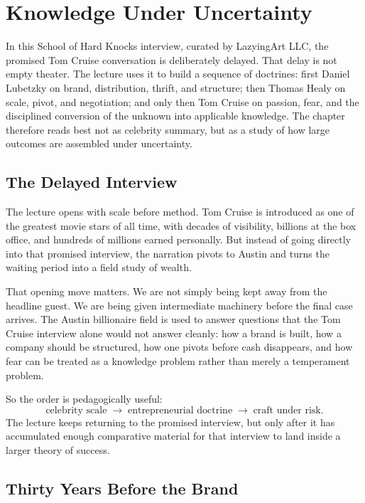 \chapter{Knowledge Under Uncertainty}

In this School of Hard Knocks interview, curated by LazyingArt LLC, the promised Tom Cruise conversation is deliberately delayed. That delay is not empty theater. The lecture uses it to build a sequence of doctrines: first Daniel Lubetzky on brand, distribution, thrift, and structure; then Thomas Healy on scale, pivot, and negotiation; and only then Tom Cruise on passion, fear, and the disciplined conversion of the unknown into applicable knowledge. The chapter therefore reads best not as celebrity summary, but as a study of how large outcomes are assembled under uncertainty.

\section{The Delayed Interview}

The lecture opens with scale before method. Tom Cruise is introduced as one of the greatest movie stars of all time, with decades of visibility, billions at the box office, and hundreds of millions earned personally. But instead of going directly into that promised interview, the narration pivots to Austin and turns the waiting period into a field study of wealth.

That opening move matters. We are not simply being kept away from the headline guest. We are being given intermediate machinery before the final case arrives. The Austin billionaire field is used to answer questions that the Tom Cruise interview alone would not answer cleanly: how a brand is built, how a company should be structured, how one pivots before cash disappears, and how fear can be treated as a knowledge problem rather than merely a temperament problem.

So the order is pedagogically useful:
\begin{equation}
\text{celebrity scale} \;\longrightarrow\; \text{entrepreneurial doctrine} \;\longrightarrow\; \text{craft under risk}.
\end{equation}
The lecture keeps returning to the promised interview, but only after it has accumulated enough comparative material for that interview to land inside a larger theory of success.

\section{Thirty Years Before the Brand}

